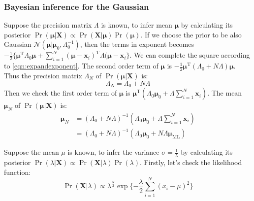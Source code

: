\subsubsection{Bayesian inference for the Gaussian}
Suppose the precision matrix $\Lambda$ is known, to infer mean $\boldsymbol{\mu}$ by 
calculating its posterior $\Pr(\boldsymbol{\mu}\vert\mathbf{X})\varpropto\Pr(\mathbf{X}\vert\boldsymbol{\mu})\Pr(\boldsymbol{\mu})$. If we choose the prior to be also Gaussian $\mathcal{N}(\boldsymbol{\mu}\vert\boldsymbol{\mu}_{0},\Lambda_{0}^{-1})$, 
then the terms in exponent becomes $-\frac{1}{2}\{\boldsymbol{\mu}^{\mathrm{T}}\Lambda_{0}\boldsymbol{\mu}+\sum_{i=1}^{N}(\boldsymbol{\mu}-\mathbf{x}_{i})^{\mathrm{T}}\Lambda{}(\boldsymbol{\mu}-\mathbf{x}_{i}\}$.
We can complete the square according to \eqref{eqn:expandexponent}.  The second order term of $\boldsymbol{\mu}$ is $-\frac{1}{2}\boldsymbol{\mu}^{\mathrm{T}}(\Lambda_{0}+N\Lambda)\boldsymbol{\mu}$. Thus the precision matrix $\Lambda_{N}$ of $\Pr(\boldsymbol{\mu}\vert\mathbf{X})$ is:
\begin{equation}
\Lambda_{N}=\Lambda_{0}+N\Lambda
\end{equation}
Then we check the first order term of $\boldsymbol{\mu}$ is $\boldsymbol{\mu}^{\mathrm{T}}(\Lambda_{0}\boldsymbol{\mu}_{0}+\Lambda{}\sum_{i=1}^{N}\mathbf{x}_{i})$. 
The mean $\boldsymbol{\mu}_{N}$ of $\Pr(\boldsymbol{\mu}\vert\mathbf{X})$ is:
\begin{equation}
\begin{split}
\boldsymbol{\mu}_{N}&=(\Lambda_{0}+N\Lambda)^{-1}(\Lambda_{0}\boldsymbol{\mu}_{0}+\Lambda{}\sum_{i=1}^{N}\mathbf{x}_{i})\\
&=(\Lambda_{0}+N\Lambda)^{-1}(\Lambda_{0}\boldsymbol{\mu}_{0}+N\Lambda{}\boldsymbol{\mu}_{\text{ML}})
\end{split}
\end{equation}


Suppose the mean $\mu$ is known, to infer the variance $\sigma=\frac{1}{\lambda}$ by calculating its posterior $\Pr(\lambda\vert\mathbf{X})\varpropto\Pr(\mathbf{X}\vert\lambda)\Pr(\lambda)$. 
Firstly, let's check the likelihood function:
\begin{equation}
\Pr(\mathbf{X}\vert\lambda)\varpropto\lambda^{\frac{N}{2}}\exp{}\{-\frac{\lambda}{2}\sum_{i=1}^{N}(x_{i}-\mu)^2\}
\end{equation}

